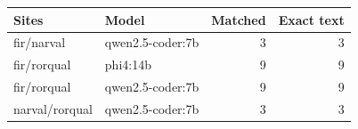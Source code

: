 \begin{tabular}{llrr}
Sites & Model & Matched & Exact text \\
\hline
fir/narval & qwen2.5-coder:7b & 3 & 3 \\
fir/rorqual & phi4:14b & 9 & 9 \\
fir/rorqual & qwen2.5-coder:7b & 9 & 9 \\
narval/rorqual & qwen2.5-coder:7b & 3 & 3 \\
\end{tabular}
